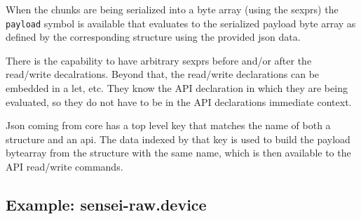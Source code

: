 \documentclass[12pt]{article}
\begin{document}
When the chunks are being serialized into a byte array (using the
sexprs) the \verb|payload| symbol is available that evaluates to the
serialized payload byte array as defined by the corresponding
structure using the provided json data.

There is the capability to have arbitrary sexprs before and/or after
the read/write decalrations. Beyond that, the read/write declarations
can be embedded in a let, etc. They know the API declaration in which
they are being evaluated, so they do not have to be in the API
declarations immediate context.

Json coming from core has a top level key that matches the name of
both a structure and an api. The data indexed by that key is used to
build the payload bytearray from the structure with the same name,
which is then available to the API read/write commands.

\subsection{Example: sensei-raw.device}
\end{document}

